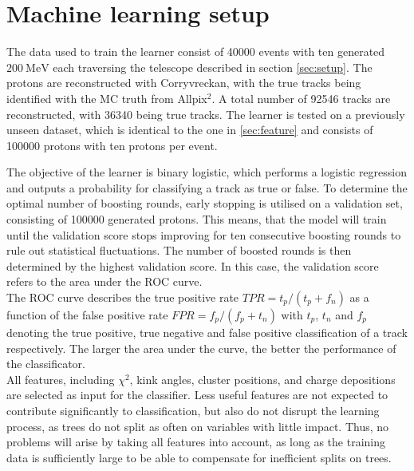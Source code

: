 \section{Machine learning setup}
The data used to train the learner %
consist of 40000 events with ten generated $\SI{200}{\mega\eV}$ each
traversing the telescope described in section \ref{sec:setup}. The protons
are reconstructed with Corryvreckan, with the true tracks being identified with the MC truth from Allpix$^2$. A total number of 92546 tracks
are reconstructed, with 36340 being true tracks.
The learner is tested on a previously unseen dataset, which is identical to the one in \ref{sec:feature} and consists of 100000 protons with ten protons per event.

The objective of the learner is binary logistic, which performs a logistic regression and outputs a probability for classifying a track as true or false.
To determine the optimal number of boosting rounds, early stopping is utilised on a validation set, consisting of 100000 generated protons. This means, that
the model will train until the validation score stops improving for ten consecutive boosting rounds to rule out statistical fluctuations.
The number of boosted rounds is then determined by the highest validation score.
In this case, the validation score refers to the area under the ROC curve. \\
The ROC curve describes the true positive rate $TPR = t_p/(t_p + f_n)$ as a function of the false positive rate $FPR = f_p/(f_p + t_n)$ with
$t_p$, $t_n$ and $f_p$ denoting the true positive, true negative and false positive classification of a track respectively. The larger the area under the curve,
the better the performance of the classificator. \\
All features, including $\chi^2$, kink angles, cluster positions, and charge depositions are selected as input for the classifier. Less useful features
are not expected to contribute significantly to classification, but also do not disrupt the learning process, as trees do not split as often on variables with little impact.
Thus, no problems will arise by taking all features into account, as long as the training data is sufficiently large to be able to compensate for inefficient splits on trees.


